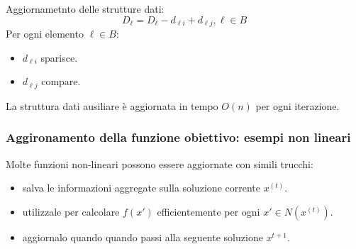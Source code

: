 \documentclass{article}
\begin{document}
Aggiornametnto delle strutture dati:
$$D_\ell=D_\ell - d_{\ell i}+d_{\ell j},\ell\in B$$
Per ogni elemento $\ell\in B$:
\begin{itemize}
    \item $d_{\ell i}$ sparisce.
    \item $d_{\ell j}$ compare.
\end{itemize}
La struttura dati ausiliare è aggiornata in tempo $O(n)$ per ogni iterazione.


\subsubsection{Aggironamento della funzione obiettivo: esempi non lineari}
Molte funzioni non-lineari possono essere aggiornate con simili trucchi:
\begin{itemize}
    \item salva le informazioni aggregate sulla soluzione corrente $x^{(t)}$.
    \item utilizzale per calcolare $f(x')$ efficientemente per ogni $x'\in N(x^{(t)})$.
    \item aggiornalo quando quando passi alla seguente soluzione $x^{t+1}$.
\end{itemize}
\end{document}
